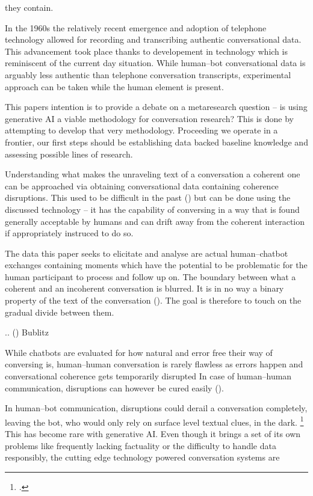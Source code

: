 \documentclass[12pt]{report}
\begin{document}
they contain.

\par
In the 1960s the relatively recent emergence and adoption of telephone technology
allowed for recording and transcribing authentic conversational data.
This advancement took place thanks to developement in technology
which is reminiscent of the current day situation.
While human–bot conversational data is arguably less authentic than telephone conversation transcripts,
experimental approach can be taken while the human element is present.

\par
This papers intention is to provide a debate on a metaresearch question –
is using generative AI a viable methodology for conversation research?
This is done by attempting to develop that very methodology.
Proceeding we operate in a frontier,
our first steps should be establishing data backed baseline knowledge
and assessing possible lines of research.

\par
Understanding what makes
the unraveling text of a conversation a coherent one
can be approached via obtaining
conversational data containing coherence disruptions.
This used to be difficult in the past () but
can be done using the discussed technology –
it has the capability of conversing in a way
that is found generally acceptable by humans
and can drift away from the coherent interaction
if appropriately instruced to do so.

\par
The data this paper seeks to elicitate and analyse are
actual human–chatbot exchanges containing moments which
have the potential to be problematic for
the human participant to process and follow up on.
The boundary between what a coherent and an incoherent conversation is blurred.
It is in no way a binary property of the text of the conversation ().
The goal is therefore to touch on the gradual divide between them.

.. () Bublitz

\par
While chatbots are evaluated for how natural and error free their way of conversing is,
human–human conversation is rarely flawless as
errors happen and
conversational coherence gets temporarily disrupted
In case of human–human communication, disruptions can however be cured easily ().

\par
In human–bot communication, disruptions could derail a conversation completely,
leaving the bot, who would only rely on surface level textual clues, in the dark. \footcite{mctear2020conversational}
This has become rare with generative AI.
Even though it brings a set of its own problems like
frequently lacking factuality or
the difficulty to handle data responsibly,
the cutting edge technology powered conversation systems are
\end{document}
